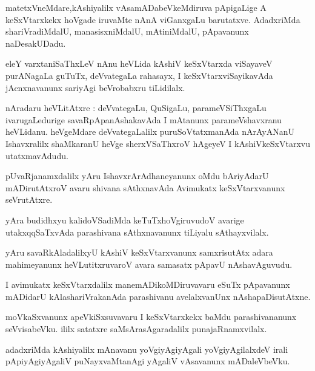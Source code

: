 \documentclass{article}
\begin{document}
\begin{mn}
matetxVneMdare,kAshiyalilx vAsamADabeVkeMdiruva pApigaLige A keSxVtarxkekx hoVgade iruvaMte nAnA 
viGanxgaLu barutatxve. AdadxriMda shariVradiMdalU, manasisxniMdalU, mAtiniMdalU, pApavanunx 
naDesakUDadu.
\end{mn}

\begin{mn}
eleY varxtaniSaThxLeV nAnu heVLida kAshiV keSxVtarxda viSayaveV purANagaLa guTuTx, deVvategaLa
rahasayx, I keSxVtarxviSayikavAda jAcnxnavanunx sariyAgi beVrobabxru tiLidilalx.
\end{mn}

\begin{mn}
nAradaru heVLitAtxre : deVvategaLu, QuSigaLu, parameVSiThxgaLu ivarugaLedurige savaRpApanAshakavAda 
I mAtanunx parameVshavxranu heVLidanu. heVgeMdare deVvategaLalilx puruSoVtatxmanAda nArAyANanU 
Ishavxralilx shaMkaranU heVge sherxVSaThxroV hAgeyeV I kAshiVkeSxVtarxvu utatxmavAdudu. 
\end{mn}

\begin{mn}
pUvaRjanamxdalilx yAru IshavxrArAdhaneyanunx oMdu bAriyAdarU mADirutAtxroV avaru shivana 
sAthxnavAda Avimukatx keSxVtarxvanunx seVrutAtxre.
\end{mn}

\begin{mn}
yAra budidhxyu kalidoVSadiMda keTuTxhoVgiruvudoV avarige utakxqqSaTxvAda parashivana sAthxnavanunx 
tiLiyalu sAthayxvilalx.
\end{mn}

\begin{mn}
yAru savaRkAladalilxyU kAshiV keSxVtarxvanunx samxrisutAtx adara mahimeyanunx heVLutitxruvaroV 
avara samasatx pApavU nAshavAguvudu.
\end{mn}

\begin{mn}
I avimukatx keSxVtarxdalilx manemADikoMDiruvavaru eSuTx pApavanunx mADidarU kAlashariVrakanAda 
parashivanu avelalxvanUnx nAshapaDisutAtxne.
\end{mn}

\begin{mn}
moVkaSxvanunx apeVkiSxsuvavaru I keSxVtarxkekx baMdu parashivananunx seVvisabeVku. ililx  
satatxre saMsArasAgaradalilx punajaRnamxvilalx.
\end{mn}

\begin{mn}
adadxriMda kAshiyalilx mAnavanu yoVgiyAgiyAgali yoVgiyAgilalxdeV irali pApiyAgiyAgaliV 
puNayxvaMtanAgi yAgaliV vAsavanunx mADaleVbeVku.
\end{mn}
\end{document}
